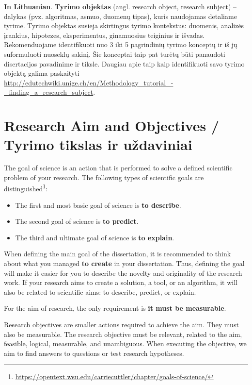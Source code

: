 \textbf{In Lithuanian}. \textbf{Tyrimo objektas} (angl. research object, research subject) – dalykas (pvz. algoritmas, asmuo, duomenų tipas), kuris naudojamas detaliame tyrime. Tyrimo objektas susieja skirtingus tyrimo kontekstus: duomenis, analizės įrankius, hipotezes, eksperimentus, ginamuosius teiginius ir išvadas. Rekomenduojame identifikuoti nuo 3 iki 5 pagrindinių tyrimo konceptų ir iš jų suformuluoti nuoseklų sakinį.
Šie konceptai taip pat turėtų būti panaudoti disertacijos pavadinime ir tiksle. Daugiau apie taip kaip identifikuoti savo tyrimo objektą galima paskaityti \url{http://edutechwiki.unige.ch/en/Methodology_tutorial_-_finding_a_research_subject}.



\section*{Research Aim and Objectives / Tyrimo tikslas ir uždaviniai}

The goal of science is an action that is performed to solve a defined scientific problem of your research.
The following types of scientific goals are distinguished\footnote{\url{https://opentext.wsu.edu/carriecuttler/chapter/goals-of-science/}}:
\begin{itemize}
    \item The first and most basic goal of science is \textbf{to describe}.
    \item The second goal of science is \textbf{to predict}.
    \item The third and ultimate goal of science is \textbf{to explain}.
\end{itemize}
When defining the main goal of the dissertation, it is recommended to think about what you managed \textbf{to create} in your dissertation. Thus, defining the goal will make it easier for you to describe the novelty and originality of the research work. 
If your research aims to create a solution, a tool, or an algorithm, it will also be related to scientific aims: to describe, predict, or explain.

For the aim of research, the only requirement is \textbf{it must be measurable}.

Research objectives are smaller actions required to achieve the aim. They must also be measurable. 
The research objective must be relevant, related to the aim, feasible, logical, measurable, and unambiguous.
When executing the objective, we aim to find answers to questions or test research hypotheses.


